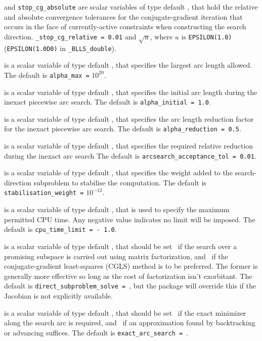 \documentclass{galahad}
\newcommand{\packagename}{BLLS}
\newcommand{\fullpackagename}{\libraryname\_\packagename}
\begin{document}
\begin{description}
 and {\tt stop\_cg\_absolute}
are scalar variables of type default \realdp,
that hold the relative and absolute convergence tolerances for the
conjugate-gradient iteration that occurs in the face of currently-active
constraints when constructing the search direction.
{\tt \_stop\_cg\_relative = 0.01}
and  $\sqrt{u}$,
where $u$ is {\tt EPSILON(1.0)} ({\tt EPSILON(1.0D0)} in
{\tt \fullpackagename\_double}).

 is a scalar variable of type default \realdp, that specifies
the largest arc length allowed.
The default is {\tt alpha\_max =} $10^{20}$.

 is a scalar variable of type default \realdp, that
specifies the initial arc length during the inexact piecewise arc search.
The default is {\tt alpha\_initial = 1.0}.

 is a scalar variable of type default \realdp, that
specifies the arc length reduction factor for the inexact piecewise arc search.
The default is {\tt alpha\_reduction = 0.5}.

 is a scalar variable of type default \realdp,
that specifies the required relative reduction during the inexact arc search
The default is {\tt arcsearch\_acceptance\_tol = 0.01}.

 is a scalar variable of type default \realdp,
that specifies the weight added to the search-direction subproblem to
stabilise the computation.
The default is {\tt stabilisation\_weight =} $10^{-12}$.

 is a scalar variable of type default \realdp,
that is used to specify the maximum permitted CPU time. Any negative
value indicates no limit will be imposed. The default is
{\tt cpu\_time\_limit = - 1.0}.

 is a scalar variable of type default \logical,
that should be set \true\ if the search over a promising subspace is
carried out using matrix factorization, and \false\ if the conjugate-gradient
least-squares (CGLS) method is to be preferred. The former is generally
more effective so long as the cost of factorization isn't exorbitant.
The default is {\tt direct\_subproblem\_solve = \true}, but the
package will override this if the Jacobian is not explicitly available.

 is a scalar variable of type default \logical,
that should be set \true\ if the exact minimizer along the search arc is
required, and \false\ if an approximation found by backtracking or
advancing suffices.
The default is {\tt exact\_arc\_search = \true}.


\end{description}
\end{document}
